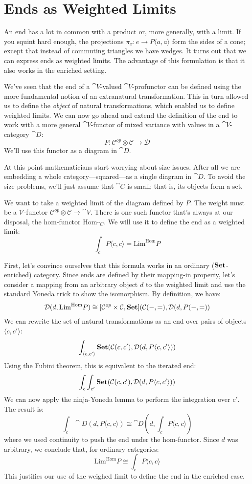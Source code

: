 \documentclass[DaoFP]{subfiles}
\begin{document}
\section{Ends as Weighted Limits}

An end has a lot in common with a product or, more generally, with a limit. If you squint hard enough, the projections $\pi_x \colon e \to P \langle a, a \rangle$ form the sides of a cone; except that instead of commuting triangles we have wedges. It turns out that we can express ends as weighted limits. The advantage of this formulation is that it also works in the enriched setting. 

We've seen that the end of a $\cat V$-valued $\cat V$-profunctor can be defined using the more fundamental notion of an extranatural transformation. This in turn allowed us to define the \emph{object} of natural transformations, which enabled us to define weighted limits. We can now go ahead and extend the definition of the end to work with a more general $\cat V$-functor of mixed variance with values in a $\cat V$-category $\cat D$:
\[ P \colon \mathcal C^{op} \otimes \mathcal C \to \mathcal D \]
We'll use this functor as a diagram in $\cat D$. 

At this point mathematicians start worrying about size issues. After all we are embedding a whole category---squared---as a single diagram in $\cat D$. To avoid the size problems, we'll just assume that $\cat C$ is small; that is, its objects form a set. 

We want to take a weighted limit of the diagram defined by $P$. The weight must be a $\mathcal V$-functor $\mathcal C^{op} \otimes \mathcal C \to \cat V$. There is one such functor that's always at our disposal, the hom-functor $\text{Hom}_{\cat C}$. We will use it to define the end as a weighted limit:
\[  \int_c P\langle c, c\rangle = \text{Lim}^{\text{Hom}} P\]

First, let's convince ourselves that this formula works in an ordinary ($\mathbf{Set}$-enriched) category. Since ends are defined by their mapping-in property, let's consider a mapping from an arbitrary object $d$ to the weighted limit and use the standard Yoneda trick to show the isomorphism. By definition, we have:
\[ \mathcal{D}(d, \text{Lim}^{\text{Hom}} P) \cong [\mathcal{C}^{op} \times \mathcal{C}, \mathbf{Set}](\mathcal{C}(-, =), \mathcal{D} (d, P(-, =))\]
We can rewrite the set of natural transformations as an end over pairs of objects $\langle c, c' \rangle$:
\[ \int_{\langle c, c' \rangle} \mathbf{Set}(\mathcal{C}(c, c'), \mathcal{D} (d, P\langle c, c' \rangle)) \]
Using the Fubini theorem, this is equivalent to the iterated end:
\[\int_c \int_{c'} \mathbf{Set}(\mathcal{C}(c, c'), \mathcal{D}(d, P\langle c, c' \rangle))\]
We can now apply the ninja-Yoneda lemma to perform the integration over $c'$. The result is:
\[ \int_c \cat D(d, P\langle c, c \rangle) \cong \cat D(d, \int_c P \langle c, c \rangle) \]
where we used continuity to push the end under the hom-functor. Since $d$ was arbitrary, we conclude that, for ordinary categories:
\[ \text{Lim}^{\text{Hom}} P \cong  \int_c P\langle c, c\rangle \]
This justifies our use of the weighed limit to define the end in the enriched case.
\end{document}
